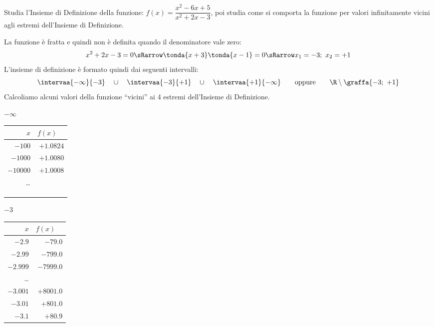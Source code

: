 \begin{esempio}
 Studia l'Insieme di Definizione della funzione: 
 \(f(x)=\dfrac{x^2-6x+5}{x^2+2x-3}\),\quad
poi studia come si comporta la funzione per valori infinitamente vicini 
agli estremi dell'Insieme di Definizione.

La funzione è fratta e quindi non è definita quando il denominatore vale 
zero:
\[x^2+2x-3=0 \sRarrow \tonda{x+3}\tonda{x-1}=0 \sRarrow x_1=-3;~x_2=+1\]
L'insieme di definizione è formato quindi dai seguenti intervalli:
\[\intervaa{-\infty}{-3} \quad \cup \quad 
\intervaa{-3}{+1}\quad \cup \quad 
\intervaa{+1}{-\infty} \qquad \text{oppure} \qquad
\R \setminus \graffa{-3;~+1}\]
Calcoliamo alcuni valori della funzione ``vicini'' ai 4 estremi 
dell'Insieme di Definizione.

\begin{minipage}{.24\textwidth}
\begin{center}
\(-\infty\)\\
\begin{tabular}{r|r}
\(x\) & \(f(x)\quad\)\\\hline
\(-100\) & \(+1.0824\) \\
\(-1000\) & \(+1.0080\) \\
\(-10000\) & \(+1.0008\) \\
\dots \\
&\\
&\\
&
\end{tabular}
\end{center}
\end{minipage}
\begin{minipage}{.24\textwidth}
\begin{center}
\(-3\)\\
\begin{tabular}{r|r}
\(x\) & \(f(x)\quad\)\\\hline
\(-2.9\) & \(-79.0\) \\
\(-2.99\) & \(-799.0\) \\
\(-2.999\) & \(-7999.0\) \\
\dots \\
\(-3.001\) & \(+8001.0\) \\
\(-3.01\) & \(+801.0\) \\
\(-3.1\) & \(+80.9\) \\
\end{tabular}
\end{center}
\end{minipage}
\begin{minipage}{.24\textwidth}

\end{minipage}
\end{esempio}
